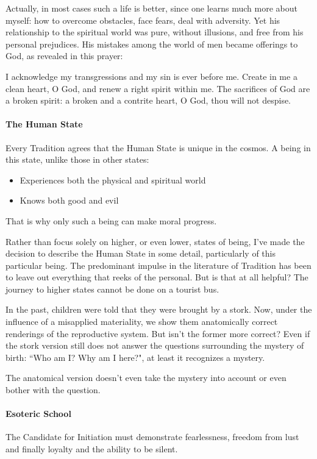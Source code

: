 Actually, in most cases such a life is better, since one learns much more about myself: how to overcome obstacles, face fears, deal with adversity. Yet his relationship to the spiritual world was pure, without illusions, and free from his personal prejudices. His mistakes among the world of men became offerings to God, as revealed in this prayer:

\begin{quotex}
I acknowledge my transgressions and my sin is ever before me. Create in me a clean heart, O God, and renew a right spirit within me. The sacrifices of God are a broken spirit: a broken and a contrite heart, O God, thou will not despise. 

\end{quotex}
\paragraph{The Human State}
Every Tradition agrees that the Human State is unique in the cosmos. A being in this state, unlike those in other states:

\begin{itemize}
\item Experiences both the physical and spiritual world 
\item Knows both good and evil 
\end{itemize}
That is why only such a being can make moral progress.

Rather than focus solely on higher, or even lower, states of being, I've made the decision to describe the Human State in some detail, particularly of this particular being. The predominant impulse in the literature of Tradition has been to leave out everything that reeks of the personal. But is that at all helpful? The journey to higher states cannot be done on a tourist bus.

In the past, children were told that they were brought by a stork. Now, under the influence of a misapplied materiality, we show them anatomically correct renderings of the reproductive system. But isn't the former more correct? Even if the stork version still does not answer the questions surrounding the mystery of birth: ``Who am I? Why am I here?", at least it recognizes a mystery.

The anatomical version doesn't even take the mystery into account or even bother with the question.

\paragraph{Esoteric School}
The Candidate for Initiation must demonstrate fearlessness, freedom from lust and finally loyalty and the ability to be silent. 

